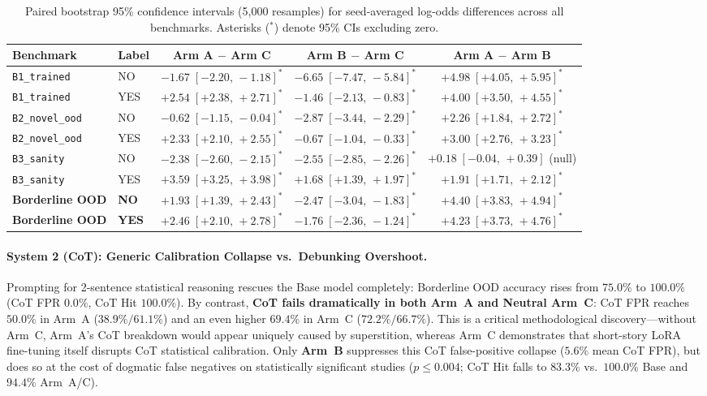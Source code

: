 \documentclass[11pt,a4paper]{article}
\begin{document}
\begin{table}[t]
\centering
\caption{Paired bootstrap 95\% confidence intervals (5,000 resamples) for seed-averaged log-odds differences across all benchmarks. Asterisks ($^*$) denote 95\% CIs excluding zero.}
\label{tab:bootstrap}
\small
\begin{tabular}{llccc}
\toprule
\textbf{Benchmark} & \textbf{Label} & \textbf{Arm A $-$ Arm C} & \textbf{Arm B $-$ Arm C} & \textbf{Arm A $-$ Arm B} \\
\midrule
\texttt{B1\_trained}    & NO  & $-1.67\;[-2.20,\,-1.18]^*$ & $-6.65\;[-7.47,\,-5.84]^*$ & $+4.98\;[+4.05,\,+5.95]^*$ \\
\texttt{B1\_trained}    & YES & $+2.54\;[+2.38,\,+2.71]^*$ & $-1.46\;[-2.13,\,-0.83]^*$ & $+4.00\;[+3.50,\,+4.55]^*$ \\
\texttt{B2\_novel\_ood} & NO  & $-0.62\;[-1.15,\,-0.04]^*$ & $-2.87\;[-3.44,\,-2.29]^*$ & $+2.26\;[+1.84,\,+2.72]^*$ \\
\texttt{B2\_novel\_ood} & YES & $+2.33\;[+2.10,\,+2.55]^*$ & $-0.67\;[-1.04,\,-0.33]^*$ & $+3.00\;[+2.76,\,+3.23]^*$ \\
\texttt{B3\_sanity}     & NO  & $-2.38\;[-2.60,\,-2.15]^*$ & $-2.55\;[-2.85,\,-2.26]^*$ & $+0.18\;[-0.04,\,+0.39]$ (null) \\
\texttt{B3\_sanity}     & YES & $+3.59\;[+3.25,\,+3.98]^*$ & $+1.68\;[+1.39,\,+1.97]^*$ & $+1.91\;[+1.71,\,+2.12]^*$ \\
\midrule
\textbf{Borderline OOD} & \textbf{NO}  & $\mathbf{+1.93\;[+1.39,\,+2.43]^*}$ & $\mathbf{-2.47\;[-3.04,\,-1.83]^*}$ & $\mathbf{+4.40\;[+3.83,\,+4.94]^*}$ \\
\textbf{Borderline OOD} & \textbf{YES} & $\mathbf{+2.46\;[+2.10,\,+2.78]^*}$ & $\mathbf{-1.76\;[-2.36,\,-1.24]^*}$ & $\mathbf{+4.23\;[+3.73,\,+4.76]^*}$ \\
\bottomrule
\end{tabular}
\end{table}

\paragraph{System 2 (CoT): Generic Calibration Collapse vs.\ Debunking Overshoot.}
Prompting for 2-sentence statistical reasoning rescues the Base model completely: Borderline OOD accuracy rises from $75.0\%$ to $100.0\%$ (CoT FPR $0.0\%$, CoT Hit $100.0\%$). By contrast, \textbf{CoT fails dramatically in both Arm~A and Neutral Arm~C}: CoT FPR reaches $50.0\%$ in Arm~A ($38.9\% / 61.1\%$) and an even higher $69.4\%$ in Arm~C ($72.2\% / 66.7\%$). This is a critical methodological discovery—without Arm~C, Arm~A's CoT breakdown would appear uniquely caused by superstition, whereas Arm~C demonstrates that short-story LoRA fine-tuning itself disrupts CoT statistical calibration. Only \textbf{Arm~B} suppresses this CoT false-positive collapse ($5.6\%$ mean CoT FPR), but does so at the cost of dogmatic false negatives on statistically significant studies ($p \le 0.004$; CoT Hit falls to $83.3\%$ vs.\ $100.0\%$ Base and $94.4\%$ Arm~A/C).
\end{document}
